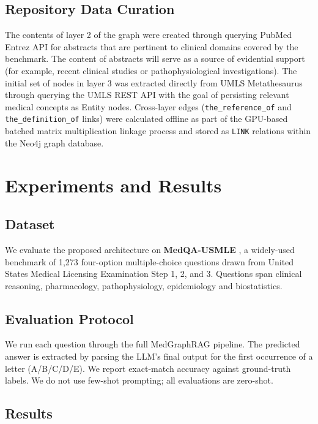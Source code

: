 \documentclass[a4paper,fleqn]{cas-sc}
\begin{document}
\subsection{Repository Data Curation}
The contents of layer 2 of the graph were created through querying PubMed Entrez API \cite{ncbi2024entrez} for abstracts that are pertinent to clinical domains covered by the benchmark. The content of abstracts will serve as a source of evidential support (for example, recent clinical studies or pathophysiological investigations). The initial set of nodes in layer 3 was extracted directly from UMLS Metathesaurus \cite{bodenreider2004umls} through querying the UMLS REST API with the goal of persisting relevant medical concepts as Entity nodes. Cross-layer edges (\texttt{the\_reference\_of} and \texttt{the\_definition\_of} links) were calculated offline as part of the GPU-based batched matrix multiplication linkage process and stored as \texttt{LINK} relations within the Neo4j graph database.

\section{Experiments and Results}

\subsection{Dataset}
We evaluate the proposed architecture on \textbf{MedQA-USMLE} \cite{jin2021medqa}, a widely-used benchmark of 1{,}273 four-option multiple-choice questions drawn from United States Medical Licensing Examination Step 1, 2, and 3. Questions span clinical reasoning, pharmacology, pathophysiology, epidemiology and biostatistics.

\subsection{Evaluation Protocol}
We run each question through the full MedGraphRAG pipeline. The predicted answer is extracted by parsing the LLM's final output for the first occurrence of a letter (A/B/C/D/E). We report exact-match accuracy against ground-truth labels. We do not use few-shot prompting; all evaluations are zero-shot.

\subsection{Results}
\end{document}
